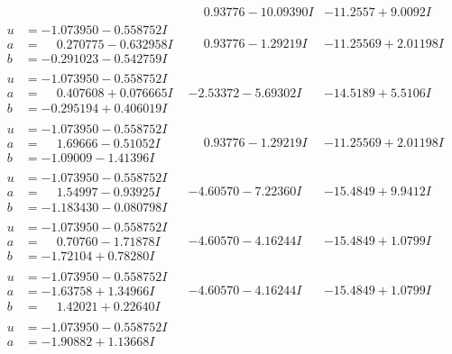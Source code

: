 \documentclass[1p]{elsarticle_modified}
\theoremstyle{definition}
\begin{document}
$$\begin{array}{c|c|c}
 & \phantom{-}0.93776 - 10.09390 I & -11.2557 + 9.0092 I \\ \hline\begin{aligned}
u &= -1.073950 - 0.558752 I \\
a &= \phantom{-}0.270775 - 0.632958 I \\
b &= -0.291023 - 0.542759 I\end{aligned}
 & \phantom{-}0.93776 - 1.29219 I & -11.25569 + 2.01198 I \\ \hline\begin{aligned}
u &= -1.073950 - 0.558752 I \\
a &= \phantom{-}0.407608 + 0.076665 I \\
b &= -0.295194 + 0.406019 I\end{aligned}
 & -2.53372 - 5.69302 I & -14.5189 + 5.5106 I \\ \hline\begin{aligned}
u &= -1.073950 - 0.558752 I \\
a &= \phantom{-}1.69666 - 0.51052 I \\
b &= -1.09009 - 1.41396 I\end{aligned}
 & \phantom{-}0.93776 - 1.29219 I & -11.25569 + 2.01198 I \\ \hline\begin{aligned}
u &= -1.073950 - 0.558752 I \\
a &= \phantom{-}1.54997 - 0.93925 I \\
b &= -1.183430 - 0.080798 I\end{aligned}
 & -4.60570 - 7.22360 I & -15.4849 + 9.9412 I \\ \hline\begin{aligned}
u &= -1.073950 - 0.558752 I \\
a &= \phantom{-}0.70760 - 1.71878 I \\
b &= -1.72104 + 0.78280 I\end{aligned}
 & -4.60570 - 4.16244 I & -15.4849 + 1.0799 I \\ \hline\begin{aligned}
u &= -1.073950 - 0.558752 I \\
a &= -1.63758 + 1.34966 I \\
b &= \phantom{-}1.42021 + 0.22640 I\end{aligned}
 & -4.60570 - 4.16244 I & -15.4849 + 1.0799 I \\ \hline\begin{aligned}
u &= -1.073950 - 0.558752 I \\
a &= -1.90882 + 1.13668 I \\

\end{aligned}
\end{array}$$
\end{document}
